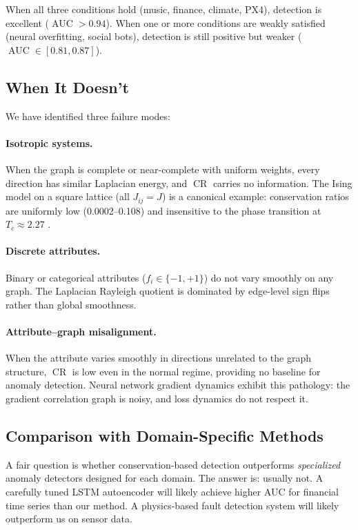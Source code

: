 \documentclass[11pt,a4paper]{article}
\DeclareMathOperator{\CR}{CR}
\DeclareMathOperator{\AUC}{AUC}
\begin{document}
When all three conditions hold (music, finance, climate, PX4), detection is
excellent ($\AUC > 0.94$).  When one or more conditions are weakly satisfied
(neural overfitting, social bots), detection is still positive but weaker
($\AUC \in [0.81, 0.87]$).

\subsection{When It Doesn't}

We have identified three failure modes:

\paragraph{Isotropic systems.} When the graph is complete or near-complete with
uniform weights, every direction has similar Laplacian energy, and $\CR$ carries
no information.  The Ising model on a square lattice (all $J_{ij} = J$) is a
canonical example: conservation ratios are uniformly low (0.0002--0.108) and
insensitive to the phase transition at $T_c \approx 2.27$
\citep{onsager1944crystal}.

\paragraph{Discrete attributes.} Binary or categorical attributes ($f_i \in
\{-1, +1\}$) do not vary smoothly on any graph.  The Laplacian Rayleigh
quotient is dominated by edge-level sign flips rather than global smoothness.

\paragraph{Attribute--graph misalignment.} When the attribute varies smoothly
in directions unrelated to the graph structure, $\CR$ is low even in the normal
regime, providing no baseline for anomaly detection.  Neural network gradient
dynamics exhibit this pathology: the gradient correlation graph is noisy, and
loss dynamics do not respect it.

\subsection{Comparison with Domain-Specific Methods}

A fair question is whether conservation-based detection outperforms
\emph{specialized} anomaly detectors designed for each domain.  The answer is:
usually not.  A carefully tuned LSTM autoencoder will likely achieve higher AUC
for financial time series than our method.  A physics-based fault detection
system will likely outperform us on sensor data.
\end{document}

